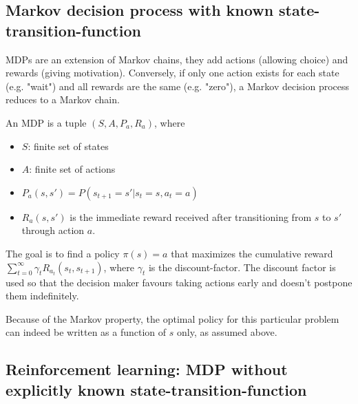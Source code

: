\subsection{Markov decision process with known state-transition-function}

MDPs are an extension of Markov chains, they add actions (allowing choice) and rewards (giving motivation). Conversely, if only one action exists for each state (e.g. "wait") and all rewards are the same (e.g. "zero"), a Markov decision process reduces to a Markov chain. 

An MDP is a tuple $(S, A, P_a, R_a)$, where 
\begin{itemize}
	\item $S$: finite set of states
	\item $A$: finite set of actions
	\item $P_a(s, s') = P(s_{t+1} = s' | s_t = s, a_t = a)$
	\item $R_a(s, s')$ is the immediate reward received after transitioning from $s$ to $s'$ through action $a$.
\end{itemize}

The goal is to find a policy $\pi(s) = a$ that maximizes the cumulative reward $\sum_{t=0}^\infty \gamma_t R_{a_t}(s_t, s_{t+1})$, where $\gamma_t$ is the discount-factor. The discount factor is used so that the decision maker favours taking actions early and doesn't postpone them indefinitely. 

Because of the Markov property, the optimal policy for this particular problem can indeed be written as a function of $s$ only, as assumed above.



\subsection{Reinforcement learning: MDP without explicitly known state-transition-function}

